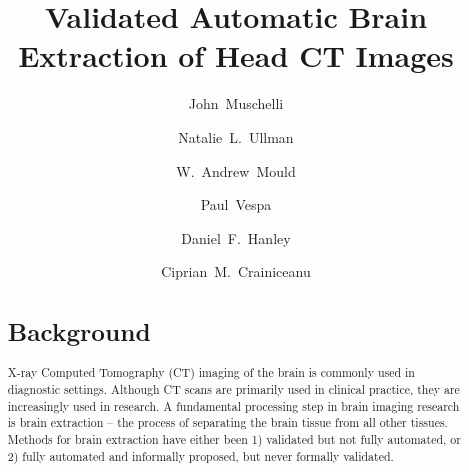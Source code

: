 \documentclass{elsarticle}\usepackage[]{graphicx}\usepackage[]{color}
\begin{document}
\renewcommand{\thesubfigure}{\Alph{subfigure}}

\begin{frontmatter}

\date{}

\title{Validated Automatic Brain Extraction of Head CT Images}

% 
% 
% 
% 
% 


\author[jhsph]{John~Muschelli}

\author[jhmi]{Natalie~L.~Ullman}

\author[jhmi]{W.~Andrew~Mould}

\author[ucla]{Paul~Vespa}


\author[jhmi]{Daniel~F.~Hanley}

\author[jhsph]{Ciprian~M.~Crainiceanu}


\address[jhsph]{Department of Biostatistics, Bloomberg School of Public Health, Johns Hopkins University, Baltimore, MD, USA}
\address[jhmi]{Department of Neurology, Division of Brain Injury Outcomes,  Johns Hopkins Medical Institutions, Baltimore, MD, USA}
\address[ucla]{Department of Neurosurgery, David Geffen School of Medicine at UCLA, Los Angeles, CA, USA}






\begin{abstract}
\section*{Background}
X-ray Computed Tomography (CT) imaging of the brain is commonly used in diagnostic settings.  Although CT scans are primarily used in clinical practice, they are increasingly used in research.  A fundamental processing step in brain imaging research is brain extraction -- the process of separating the brain tissue from all other tissues. Methods for brain extraction have either been 1) validated but not fully automated, or 2) fully automated and informally proposed, but never formally validated.



\end{abstract}
\end{frontmatter}
\end{document}
